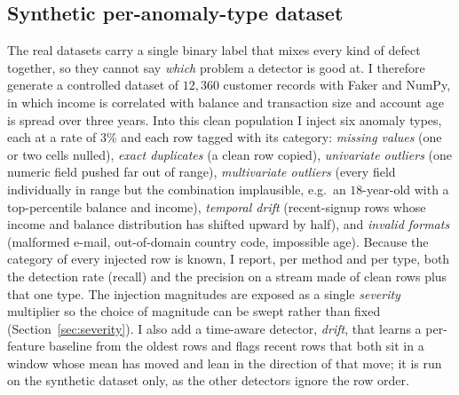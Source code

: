 \documentclass[conference]{IEEEtran}
\begin{document}
\subsection{Synthetic per-anomaly-type dataset}
\label{sec:synthetic}
The real datasets carry a single binary label that mixes every kind of
defect together, so they cannot say \emph{which} problem a detector is
good at. I therefore generate a controlled dataset of $12{,}360$
customer records with Faker and NumPy, in which income is correlated with
balance and transaction size and account age is spread over three years.
Into this clean population I inject six anomaly types, each at a rate of
$3\%$ and each row tagged with its category: \emph{missing values} (one
or two cells nulled), \emph{exact duplicates} (a clean row copied),
\emph{univariate outliers} (one numeric field pushed far out of range),
\emph{multivariate outliers} (every field individually in range but the
combination implausible, e.g.\ an $18$-year-old with a top-percentile
balance and income), \emph{temporal drift} (recent-signup rows whose
income and balance distribution has shifted upward by half), and
\emph{invalid formats} (malformed e-mail, out-of-domain country code,
impossible age). Because the category of every injected row is known, I
report, per method and per type, both the detection rate (recall) and the
precision on a stream made of clean rows plus that one type. The injection
magnitudes are exposed as a single \emph{severity} multiplier so the
choice of magnitude can be swept rather than fixed
(Section~\ref{sec:severity}). I also add a time-aware detector,
\emph{drift}, that learns a per-feature baseline from the oldest rows and
flags recent rows that both sit in a window whose mean has moved and lean
in the direction of that move; it is run on the synthetic dataset only, as
the other detectors ignore the row order.
\end{document}
